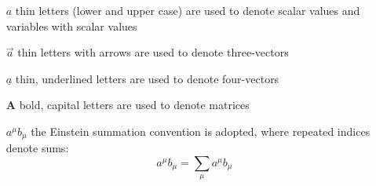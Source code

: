 \begin{itemize}
\item[$a$] thin letters (lower and upper case) are used to denote scalar values and variables with scalar values

\item[$\vec{a}$] thin letters with arrows are used to denote three-vectors

\item[$\underline{a}$] thin, underlined letters are used to denote four-vectors

\item[$\mathbf{A}$] bold, capital letters are used to denote matrices

\item[$a^\mu b_\mu$] the Einstein summation convention is adopted, where repeated indices denote sums: $$a^\mu b_\mu = \sum_\mu a^\mu b_\mu$$
\end{itemize}



\newpage


\pagestyle{scrheadings}












\iffalse
\appendix




\clearpage






\addcontentsline{toc}{chapter}{References}%





\printindex

\addcontentsline{toc}{chapter}{Index}%

\fi

